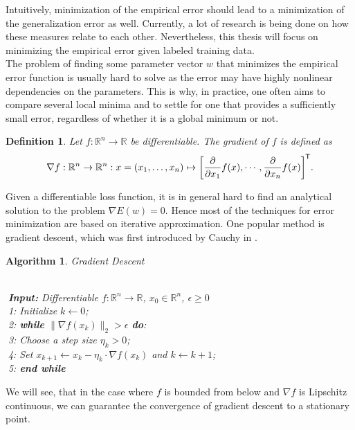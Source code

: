 \documentclass[11pt, a4paper]{article}
\newtheorem{definition}[theorem]{Definition}
\newtheorem{algorithm}[theorem]{Algorithm}
\newcommand{\R}{\mathbb{R}}
\newcommand*{\tr}{^{\mkern-1.5mu\mathsf{T}}}
\begin{document}
Intuitively, minimization of the empirical error should lead to a minimization of the generalization error as well. Currently, a lot of research is being done on how these measures relate to each other. Nevertheless, this thesis will focus on minimizing the empirical error given labeled training data. \\

The problem of finding some parameter vector $w$ that minimizes the empirical error function is usually hard to solve as the error may have highly nonlinear dependencies on the parameters. This is why, in practice, one often aims to compare several local minima and to settle for one that provides a sufficiently small error, regardless of whether it is a global minimum or not.

\begin{definition}
Let $f: \R^n \to \R$ be differentiable. The gradient of $f$ is defined as
\[ \nabla f : \R^n \to \R^n : x = (x_1, \dots, x_n) \mapsto \bigg [ \frac{\partial}{\partial x_1} f(x), \cdots, \frac{\partial}{\partial x_n} f(x) \bigg ]\tr . \]
\end{definition}

Given a differentiable loss function, it is in general hard to find an analytical solution to the problem $\nabla E(w) = 0$. Hence most of the techniques for error minimization are based on iterative approximation. One popular method is gradient descent, which was first introduced by Cauchy in \cite{GD}.

\begin{algorithm}
\caption{Gradient Descent \textcolor{white}{$\Big |$}} \ \\
\textcolor{white}{$\Big |$}\textbf{Input:} Differentiable $f: \R^n \to \R$, $x_0 \in \R^n$, $\epsilon \geq 0$ \\
\textcolor{white}{$\Big |$}1: Initialize $k \leftarrow 0$; \\
\textcolor{white}{$\Big |$}2: \textbf{while} $ \big \| \nabla f(x_k) \big \|_2 > \epsilon $ \textbf{do}:\\
\textcolor{white}{$\Big |$}3: \quad Choose a step size $\eta_k > 0$; \\
\textcolor{white}{$\Big |$}4: \quad Set $x_{k+1} \leftarrow x_k - \eta_k \cdot \nabla f(x_k)$ and $k \leftarrow k+1$; \\
\textcolor{white}{$\Big |$}5: \textbf{end while}
\end {algorithm}

We will see, that in the case where $f$ is bounded from below and $\nabla f$ is Lipschitz continuous, we can guarantee the  convergence of gradient descent to a stationary point.
\end{document}
